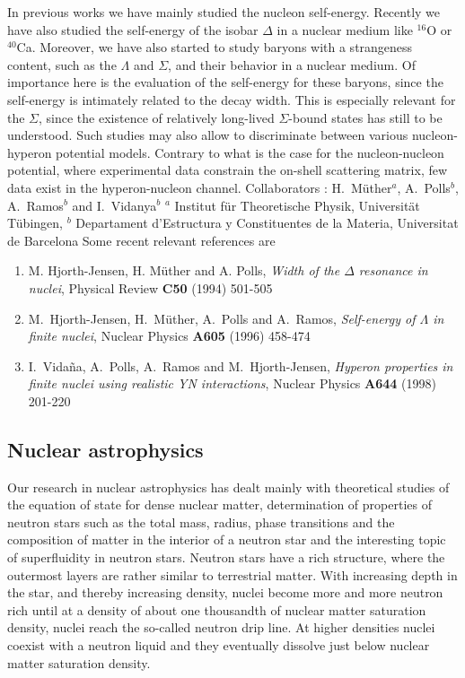 In previous works we have mainly studied the nucleon
self-energy. Recently we have also studied
the self-energy of the isobar $\Delta$ in a nuclear medium like
$^{16}$O or $^{40}$Ca.
Moreover, we have also started to study
baryons with a strangeness content,
such as the
$\Lambda$ and $\Sigma$, and their behavior in a nuclear
medium.
Of importance here is the evaluation of the self-energy for these
baryons, since the self-energy is intimately related to the
decay width.
This is especially relevant for the $\Sigma$, since the existence
of relatively long-lived $\Sigma$-bound states has still to be
understood. Such studies may also allow to discriminate
between various nucleon-hyperon potential models. Contrary to
what is the case for the nucleon-nucleon potential, where experimental
data  constrain the on-shell scattering matrix, few data exist
in the hyperon-nucleon channel.
\newline
\newline
Collaborators :
H.\ M\"{u}ther${}^a$,
A.\ Polls${}^{b}$, A.\ Ramos${}^{b}$ and I.\ Vidanya${}^{b}$\newline
${}^a$ Institut f\"{u}r Theoretische Physik,
Universit\"{a}t T\"{u}bingen,\newline
${}^{b}$ Departament d'Estructura y Constituentes de la Materia,
Universitat de Barcelona\newline\newline
Some recent relevant references are
\begin{enumerate}
\item
    M. Hjorth-Jensen, H. M\"{u}ther and A. Polls,
    {\em Width of the $\Delta$ resonance in nuclei},
    Physical Review {\bf C50} (1994) 501-505
\item M.\ Hjorth-Jensen, H.\ M\"{u}ther, A.\ Polls and A.\ Ramos,
    {\em Self-energy of $\Lambda$  in finite nuclei},
    Nuclear Physics {\bf A605} (1996) 458-474
\item I.\ Vida\~na, A.\ Polls, A.\ Ramos and  
       M.\ Hjorth-Jensen,
    {\em Hyperon properties in finite nuclei using realistic YN interactions},
    Nuclear Physics {\bf A644} (1998) 201-220
\end{enumerate}

\subsection{Nuclear astrophysics}

Our research in nuclear astrophysics has dealt mainly 
with theoretical
studies of the equation of state for dense nuclear matter,
determination of properties of neutron stars such as the total mass,
radius, phase transitions and the composition
of matter in the interior of a neutron star and the interesting topic
of superfluidity in neutron stars. 
Neutron stars have a rich structure, where the outermost layers 
are rather similar to terrestrial matter. With increasing depth
in the star, and thereby increasing density, nuclei become more and
more neutron rich until at a density of about one thousandth of nuclear
matter saturation density, nuclei reach the so-called neutron drip line.
At higher densities nuclei coexist with a neutron liquid and they 
eventually dissolve just below nuclear matter saturation density.

